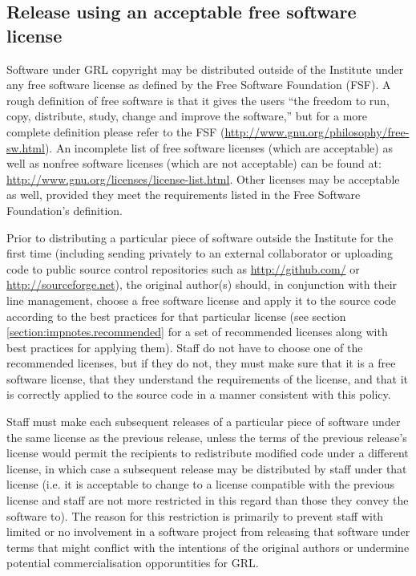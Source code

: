 \documentclass[10pt,a4paper]{article}
\begin{document}
\subsection{Release using an acceptable free software license}
\label{section:policy.licenses}
\par Software under GRL copyright may be distributed outside of 
the Institute under any free software license as defined by the Free 
Software Foundation (FSF). A rough definition of free software is that it gives 
the users ``the freedom to run, copy, distribute, study, change and improve 
the software,'' but for a more complete definition please refer to the FSF 
(\url{http://www.gnu.org/philosophy/free-sw.html}). An incomplete list of free 
software licenses (which are acceptable) as well as nonfree software licenses 
(which are not acceptable) can be found at: 
\url{http://www.gnu.org/licenses/license-list.html}. Other licenses may be 
acceptable as well, provided they meet the requirements listed in the Free 
Software Foundation's definition. 

\par Prior to distributing a particular piece of software outside the Institute for the 
first time (including sending privately to an external collaborator or uploading code 
to public source control repositories such as \url{http://github.com/} 
or \url{http://sourceforge.net}), the original author(s) should, in conjunction with their 
line management, choose a free software license and apply it to the source code 
according to the best practices for that particular license 
(see section \ref{section:impnotes.recommended} for a set of recommended 
licenses along with best practices for applying them). Staff do not have to choose 
one of the recommended licenses, but if they do not, they must make sure that it 
is a free software license, that they understand the requirements of the license, 
and that it is correctly applied to the source code in a manner consistent with 
this policy. 

\par Staff must make each subsequent releases of a particular piece of software 
under the same license as the previous release, unless the terms of the previous 
release's license would permit the recipients to redistribute modified code under a 
different license, in which case a subsequent release may be distributed by staff 
under that license (i.e. it is acceptable to change to a license compatible with 
the previous license and staff are not more restricted in this regard than those 
they convey the software to). The reason for this restriction is primarily to prevent 
staff with limited or no involvement in a software project from releasing that 
software under terms that might conflict with the intentions of the original 
authors or undermine potential commercialisation opporuntities for GRL. 
\end{document}

